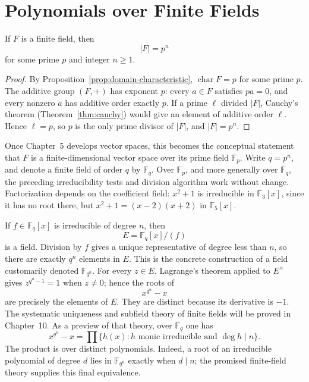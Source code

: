 \section{Polynomials over Finite Fields}
\begin{proposition}
\label{prop:finite-field-prime-power-order}
If \(F\) is a finite field, then
\[
|F|=p^n
\]
for some prime \(p\) and integer \(n\geq1\).
\end{proposition}
\begin{proof}
By Proposition~\ref{prop:domain-characteristic},
\(\operatorname{char}F=p\) for some prime \(p\). The additive group
\((F,+)\) has exponent \(p\): every \(a\in F\) satisfies \(pa=0\), and
every nonzero \(a\) has additive order exactly \(p\). If a prime \(\ell\)
divided \(|F|\), Cauchy's theorem (Theorem~\ref{thm:cauchy}) would give an
element of additive order \(\ell\). Hence \(\ell=p\), so \(p\) is the only
prime divisor of \(|F|\), and \(|F|=p^n\).
\end{proof}

Once Chapter~5 develops vector spaces, this becomes the conceptual statement
that \(F\) is a finite-dimensional vector space over its prime field
\(\mathbb F_p\). Write \(q=p^n\), and denote a finite field of order \(q\)
by \(\mathbb F_q\). Over \(\mathbb F_p\), and more generally over
\(\mathbb F_q\),
the preceding irreducibility tests and division algorithm work without change.
Factorization depends on the coefficient field: \(x^2+1\) is irreducible in
\(\mathbb F_3[x]\), since it has no root there, but
\(x^2+1=(x-2)(x+2)\) in \(\mathbb F_5[x]\).

If \(f\in\mathbb F_q[x]\) is irreducible of degree \(n\), then
\[E=\mathbb F_q[x]/(f)\]
is a field.  Division by \(f\) gives a unique representative of degree less
than \(n\), so there are exactly \(q^n\) elements in \(E\).  This is the
concrete construction of a field customarily denoted \(\mathbb F_{q^n}\).
For every \(z\in E\), Lagrange's theorem applied to \(E^\times\) gives
\(z^{q^n-1}=1\) when \(z\ne0\); hence the roots of
\[
x^{q^n}-x
\]
are precisely the elements of \(E\).  They are distinct because its
derivative is \(-1\).  The systematic uniqueness and subfield theory of
finite fields will be proved in Chapter~10.  As a preview of that theory,
over \(\mathbb F_q\) one has
\[
x^{q^n}-x=\prod \{h(x):h\text{ monic irreducible and }\deg h\mid n\}.
\]
The product is over distinct polynomials.  Indeed, a root of an irreducible
polynomial of degree \(d\) lies in \(\mathbb F_{q^n}\) exactly when \(d\mid n\);
the promised finite-field theory supplies this final equivalence.

